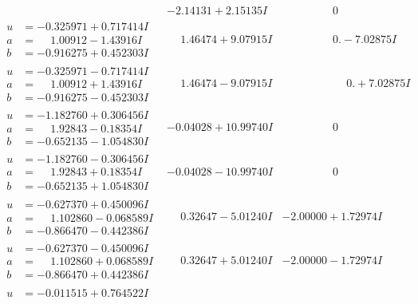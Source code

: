 \documentclass[1p]{elsarticle_modified}
\theoremstyle{definition}
\begin{document}
$$\begin{array}{c|c|c}
 & -2.14131 + 2.15135 I & \phantom{-0.000000 } 0 \\ \hline\begin{aligned}
u &= -0.325971 + 0.717414 I \\
a &= \phantom{-}1.00912 - 1.43916 I \\
b &= -0.916275 + 0.452303 I\end{aligned}
 & \phantom{-}1.46474 + 9.07915 I & \phantom{-0.000000 } 0. - 7.02875 I \\ \hline\begin{aligned}
u &= -0.325971 - 0.717414 I \\
a &= \phantom{-}1.00912 + 1.43916 I \\
b &= -0.916275 - 0.452303 I\end{aligned}
 & \phantom{-}1.46474 - 9.07915 I & \phantom{-0.000000 -}0. + 7.02875 I \\ \hline\begin{aligned}
u &= -1.182760 + 0.306456 I \\
a &= \phantom{-}1.92843 - 0.18354 I \\
b &= -0.652135 - 1.054830 I\end{aligned}
 & -0.04028 + 10.99740 I & \phantom{-0.000000 } 0 \\ \hline\begin{aligned}
u &= -1.182760 - 0.306456 I \\
a &= \phantom{-}1.92843 + 0.18354 I \\
b &= -0.652135 + 1.054830 I\end{aligned}
 & -0.04028 - 10.99740 I & \phantom{-0.000000 } 0 \\ \hline\begin{aligned}
u &= -0.627370 + 0.450096 I \\
a &= \phantom{-}1.102860 - 0.068589 I \\
b &= -0.866470 - 0.442386 I\end{aligned}
 & \phantom{-}0.32647 - 5.01240 I & -2.00000 + 1.72974 I \\ \hline\begin{aligned}
u &= -0.627370 - 0.450096 I \\
a &= \phantom{-}1.102860 + 0.068589 I \\
b &= -0.866470 + 0.442386 I\end{aligned}
 & \phantom{-}0.32647 + 5.01240 I & -2.00000 - 1.72974 I \\ \hline\begin{aligned}
u &= -0.011515 + 0.764522 I \\

\end{aligned}
\end{array}$$
\end{document}
